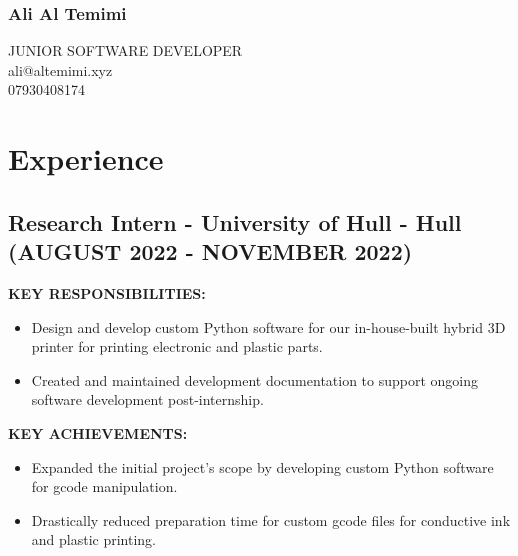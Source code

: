 \documentclass{article}
\begin{document}
\begin{multicols}{2}
    \subsubsection{Ali Al Temimi}
    \raggedright\small JUNIOR SOFTWARE DEVELOPER\\
    \columnbreak
    \Large\raggedleft ali@altemimi.xyz \\ 07930408174
    \noindent
\end{multicols}

\section{Experience}
\subsection{Research Intern - \textnormal{University of Hull - Hull} \footnotesize{(AUGUST 2022 - NOVEMBER 2022)}}

\noindent
\begin{minipage}[t]{0.48\textwidth}
    \footnotesize{\textbf{KEY RESPONSIBILITIES:}}
    \normalsize{}
    \begin{itemize}[leftmargin=*]
        \item Design and develop custom Python software for our in-house-built hybrid 3D printer for printing electronic and plastic parts. 
        \item Created and maintained development documentation to support ongoing software development post-internship.

    \end{itemize}
\end{minipage}
\hfill
\begin{minipage}[t]{0.48\textwidth}
    \footnotesize{\textbf{KEY ACHIEVEMENTS:}}
    \normalsize{}
    \begin{itemize}[leftmargin=*]
        \item Expanded the initial project’s scope by developing custom Python software for gcode manipulation.
        \item Drastically reduced preparation time for custom gcode files for conductive ink and plastic printing. 
    \end{itemize}
\end{minipage}
\end{document}
